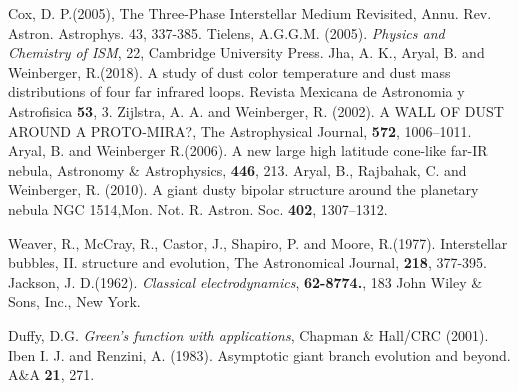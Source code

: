 \documentclass[fleqn,a4paper,12pt,oneside]{article}
\begin{document}
\begin{thebibliography}{}
	 Cox, D. P.(2005), The Three-Phase Interstellar Medium Revisited, Annu. Rev. Astron. Astrophys. 43, 337-385.
	  Tielens, A.G.G.M. (2005). \emph{ Physics and Chemistry of ISM}, 22, Cambridge University Press.
	 Jha, A. K.,   Aryal, B. and  Weinberger, R.(2018). A study of dust color temperature and dust mass distributions of
	four far infrared loops. Revista Mexicana de Astronomia y Astrofisica \textbf{53}, 3.
		 Zijlstra, A. A. and    Weinberger, R. (2002). A WALL OF DUST AROUND A PROTO-MIRA?, The Astrophysical Journal, \textbf{572}, 1006–1011.
		 Aryal, B. and  Weinberger R.(2006). A new large high latitude cone-like far-IR nebula, Astronomy \&
		Astrophysics, \textbf{446}, 213. 
		  Aryal, B.,  Rajbahak, C. and  Weinberger, R.  (2010). A giant dusty bipolar structure around the planetary nebula NGC 1514,Mon. Not. R. Astron. Soc. \textbf{402}, 1307–1312.

	 Weaver, R., McCray,  R., Castor,  J.,  Shapiro, P. and  Moore, R.(1977). Interstellar bubbles, II. structure and evolution, The Astronomical Journal,  \textbf{218}, 377-395.
	 Jackson, J. D.(1962). \emph{Classical electrodynamics}, \textbf{62-8774.}, 183 John Wiley \& Sons, Inc., New York.
	
	 Duffy, D.G. \emph{Green's  function with applications},  Chapman \&  Hall/CRC (2001).
	  Iben I. J. and  Renzini,  A.  (1983). Asymptotic giant branch evolution and beyond. A\&A \textbf{21}, 271.
	
	


\end{thebibliography}
\end{document}
